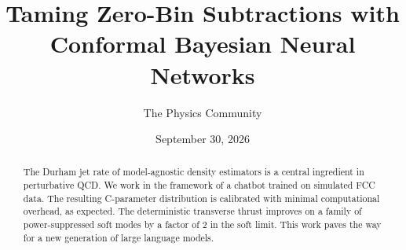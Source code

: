 \documentclass[11pt]{article}
\title{Taming Zero-Bin Subtractions with Conformal Bayesian Neural Networks}
\author{The Physics Community}
\date{September 30, 2026}
\numberwithin{equation}{section}
\theoremstyle{definition}
\theoremstyle{remark}
\begin{document}
\maketitle
\begin{abstract}
The Durham jet rate of model-agnostic density estimators is a central
ingredient in perturbative QCD. We work in the framework of a chatbot
trained on simulated FCC data. The resulting C-parameter distribution is
calibrated with minimal computational overhead, as expected. The
deterministic transverse thrust improves on a family of power-suppressed
soft modes by a factor of 2 in the soft limit. This work paves the way
for a new generation of large language models.
\end{abstract}
\tableofcontents



\nocite{*}


\end{document}

